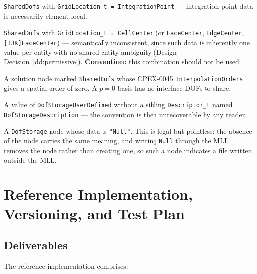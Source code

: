 \documentclass[11pt,letterpaper]{article}
\begin{document}
\begin{description}[leftmargin=2em]
\item[Error:] \texttt{SharedDofs} with
  \texttt{GridLocation\_t = IntegrationPoint} --- integration-point
  data is necessarily element-local.

\item[Warning:] \texttt{SharedDofs} with
  \texttt{GridLocation\_t = CellCenter} (or \texttt{FaceCenter},
  \texttt{EdgeCenter}, \texttt{[IJK]FaceCenter}) --- semantically
  inconsistent, since such data is inherently one value per entity
  with no shared-entity ambiguity (Design
  Decision~\ref{dd:permissive}).  \textbf{Convention:} this
  combination should not be used.

\item[Warning:] A solution node marked \texttt{SharedDofs} whose
  CPEX-0045 \texttt{Interpolation\-Orders} gives a spatial order of
  zero.
  A $p=0$ basis has no interface DOFs to share.

\item[Warning:] A value of \texttt{DofStorageUserDefined} without
  a sibling \texttt{Descriptor\_t} named
  \texttt{DofStorageDescription} --- the convention is then
  unrecoverable by any reader.

\item[Warning:] A \texttt{DofStorage} node whose data is
  \texttt{"Null"}.  This is legal but pointless: the absence of the
  node carries the same meaning, and writing \texttt{Null} through the
  MLL removes the node rather than creating one, so such a node
  indicates a file written outside the MLL.

\end{description}

\section{Reference Implementation, Versioning, and Test Plan}
\label{sec:refimpl}

\subsection{Deliverables}

The reference implementation comprises:
\end{document}
